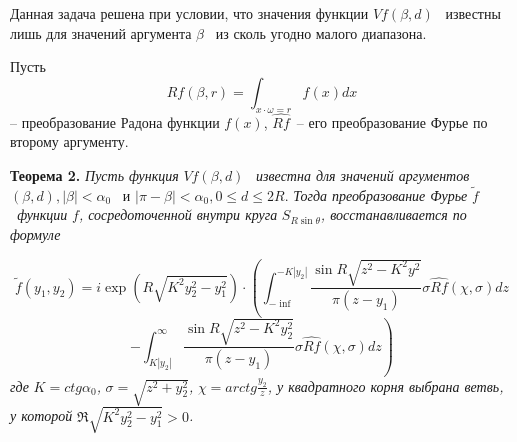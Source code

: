 Данная задача решена при условии, что значения функции  $\mathit{Vf}\left(\beta ,d\right)$ \ известны лишь для значений
аргумента  $\beta $ \ из сколь угодно малого диапазона.

Пусть
\begin{equation*}
\mathit{Rf}\left(\beta ,r\right)=\int _{x{\cdot}\omega =r}^{}f(x)\mathit{dx}
\end{equation*}
-- преобразование Радона функции  $f(x)$,  $\widehat {\mathit{Rf}}$\ – его преобразование Фурье по второму аргументу.

\textbf{Теорема 2.} \textit{Пусть функция}  $\mathit{Vf}\left(\beta ,d\right)$ \ \textit{известна для значений
	аргументов}  $\left(\beta ,d\right),\left|\beta \right|<\alpha _0$ \ и  $\left|\pi -\beta \right|<\alpha
_0,0{\leq}d{\leq}2R$. \textit{Тогда преобразование Фурье } $\widetilde f$ \textit{\ функции } $f$\textit{,
	сосредоточенной внутри круга } $S_{R\sin \theta }$\textit{, восстанавливается по формуле}

\begin{equation*}
\widetilde f\left(y_1,y_2\right)=i\exp \left(R\sqrt{K^2y_2^2-y_1^2}\right){\cdot}\left(\int_{-\inf}^{-K\left|y_2\right|}\frac{\sin R \sqrt{z^2-K^2y^2}}{\pi(z - y_1)}\sigma\widehat{Rf}(\chi, \sigma)dz\right.
\end{equation*}
\begin{equation*}
\left.-\int _{K\left|y_2^{}\right|}^{{\infty}}\frac{\sin R\sqrt{z^2-K^2y_2^2}}{\pi \left(z-y_1\right)}\sigma \widehat
{\mathit{Rf}}\left(\chi ,\sigma \right)\mathit{dz}\right)
\end{equation*}
\textit{где } $K=\mathit{ctg}\alpha _0$\textit{, } $\sigma =\sqrt{z^2+y_2^2}$\textit{,} $\chi =\mathit{arctg}\frac{y_2}
z$\textit{, у квадратного корня выбрана ветвь, у которой } $\Re \sqrt{K^2y_2^2-y_1^2}>0$\textit{.}